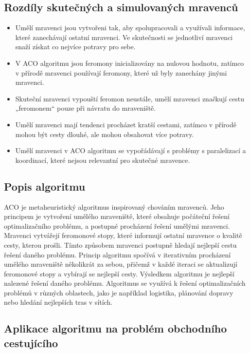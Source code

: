 \subsection{Rozdíly skutečných a simulovaných mravenců}
\begin{itemize}
\item{ Umělí mravenci jsou vytvořeni tak, aby spolupracovali a využívali informace, které zanechávají ostatní mravenci. Ve skutečnosti se jednotliví mravenci snaží získat co nejvíce potravy pro sebe.}


\item{V ACO algoritmu jsou feromony inicializovány na nulovou hodnotu, zatímco v přírodě mravenci používají feromony, které už byly zanechány jinými mravenci.}
\item{ Skuteční mravenci vypouští feromon neustále, umělí mravenci značkují cestu 
„feromonem“ pouze při návratu do mraveniště. \cite{zbřil2012zaklady}}

\item{Umělí mravenci mají tendenci procházet kratší cestami, zatímco v přírodě mohou být cesty dlouhé, ale mohou obsahovat více potravy.}

\item{Umělí mravenci v ACO algoritmu se vypořádávají s problémy s paralelizací a koordinací, které nejsou relevantní pro skutečné mravence.}
\end{itemize}

\subsection{Popis algoritmu}
ACO je metaheuristický algoritmus inspirovaný chováním mravenců. Jeho principem je vytvoření umělého mraveniště, které obsahuje počáteční řešení optimalizačního problému, a postupné procházení řešení umělými mravenci. Mravenci vytvářejí feromonové stopy, které informují ostatní mravence o kvalitě cesty, kterou prošli. Tímto způsobem mravenci postupně hledají nejlepší cestu řešení daného problému.
Princip algoritmu spočívá v iterativním procházení umělého mraveniště několikrát za sebou, přičemž v každé iteraci se aktualizují feromonové stopy a vybírají se nejlepší cesty. Výsledkem algoritmu je nejlepší nalezené řešení daného problému.
Algoritmus se využívá k řešení optimalizačních problémů v různých oblastech, jako je například logistika, plánování dopravy nebo hledání nejlepších tras v sítích.

\subsection{Aplikace algoritmu na problém obchodního cestujícího}

